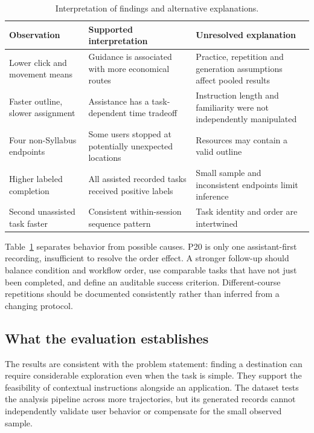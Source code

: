 \documentclass[11pt,a4paper]{article}
\begin{document}
\begin{table}[htbp]\centering\small
\caption{Interpretation of findings and alternative explanations.}\label{tab:interpret}
\begin{tabularx}{\linewidth}{>{\raggedright\arraybackslash}X>{\raggedright\arraybackslash}X>{\raggedright\arraybackslash}X}\toprule
Observation & Supported interpretation & Unresolved explanation\\\midrule
Lower click and movement means & Guidance is associated with more economical routes & Practice, repetition and generation assumptions affect pooled results\\
Faster outline, slower assignment & Assistance has a task-dependent time tradeoff & Instruction length and familiarity were not independently manipulated\\
Four non-Syllabus endpoints & Some users stopped at potentially unexpected locations & Resources may contain a valid outline\\
Higher labeled completion & All assisted recorded tasks received positive labels & Small sample and inconsistent endpoints limit inference\\
Second unassisted task faster & Consistent within-session sequence pattern & Task identity and order are intertwined\\\bottomrule
\end{tabularx}\end{table}

Table~\ref{tab:interpret} separates behavior from possible causes. P20 is only one assistant-first recording, insufficient to resolve the order effect. A stronger follow-up should balance condition and workflow order, use comparable tasks that have not just been completed, and define an auditable success criterion. Different-course repetitions should be documented consistently rather than inferred from a changing protocol.

\subsection{What the evaluation establishes}
The results are consistent with the problem statement: finding a destination can require considerable exploration even when the task is simple. They support the feasibility of contextual instructions alongside an application. The dataset tests the analysis pipeline across more trajectories, but its generated records cannot independently validate user behavior or compensate for the small observed sample.
\end{document}
